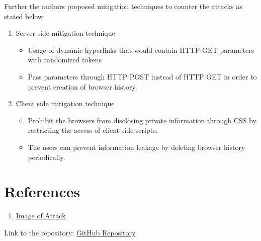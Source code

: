 \documentclass{article}
\begin{document}
Further the authors proposed mitigation techniques to counter the attacks as stated below
\begin{enumerate}
\item  Server­ side mitigation technique
\begin{itemize}
\item Usage of dynamic hyperlinks that would contain HTTP GET parameters with randomized tokens
\item Pass parameters through HTTP POST instead of HTTP GET in order to prevent creation of browser history.
\end{itemize}
   
\item  Client ­side mitigation technique 
\begin{itemize}
\item	Prohibit the browsers from disclosing private information through CSS by restricting the access of client-side scripts. 
\item	The users can prevent information leakage by deleting browser history periodically. 
\end{itemize}
\end{enumerate}

 
\section*{References}

\begin{enumerate}
\item  \href{http://www.cs.wustl.edu/~jain/cse571-11/ftp/social/index.html}{Image of Attack}
\end{enumerate}


Link to the repository:  \href{https://github.com/rsaranya/SecurityAlgorithm}{GitHub Repository}
\end{document}
